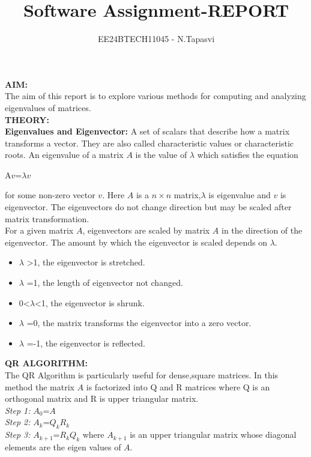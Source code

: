 \documentclass[journal]{IEEEtran}
\begin{document}

\vspace{3cm}

\title{Software Assignment-REPORT}
\author{EE24BTECH11045 - N.Tapasvi}
{\let\newpage\relax\maketitle}


\textbf{AIM:}\\
The aim of this report is to explore various methods for computing and analyzing eigenvalues of matrices.\\

\textbf{THEORY:}\\
\textbf{Eigenvalues and Eigenvector:} A set of scalars that describe how a matrix transforms a vector. They are also called characteristic values or characteristic roots. An eigenvalue of a matrix $A$ is the value of $\lambda$ which satisfies the equation\\ \centerline{A$v$=$\lambda v$} for some non-zero vector $v$. Here $A$ is a $n \times n$ matrix,$\lambda$ is eigenvalue and $v$ is eigenvector. The eigenvectors do not change direction but may be scaled after matrix transformation.\\

For a given matrix $A$, eigenvectors are scaled by matrix $A$ in the direction of the eigenvector. The amount by which the eigenvector is scaled depends on $\lambda$.
\begin{itemize}
	\item $\lambda$ >1, the eigenvector is stretched.
	\item $\lambda$ =1, the length of eigenvector not changed.
	\item 0<$\lambda$<1, the eigenvector is shrunk.
	\item $\lambda$ =0, the matrix transforms the eigenvector into a zero vector.
	\item $\lambda$ =-1, the eigenvector is reflected.\\
\end{itemize}



\textbf{QR ALGORITHM:}\\
The QR Algorithm is particularly useful for dense,square matrices. In this method the matrix $A$ is factorized into Q and R matrices where Q is an orthogonal matrix and R is upper triangular matrix.\\
\textit{Step 1:} $A_0$=$A$\\
\textit{Step 2:} $A_k$=$Q_k R_k$\\
\textit{Step 3:} $A_{k+1}$=$R_k Q_k$ where $A_{k+1}$ is an upper triangular matrix whose diagonal elements are the eigen values of $A$.\\
\end{document}
